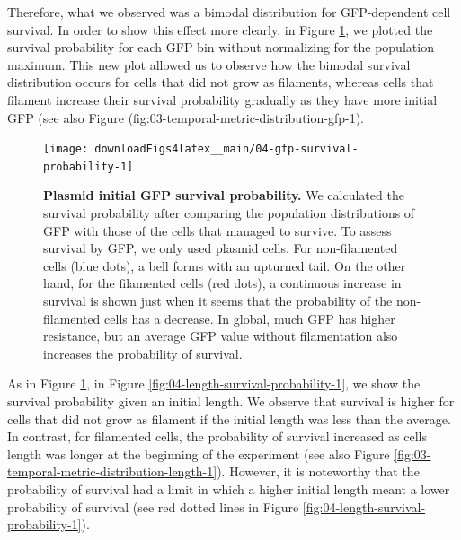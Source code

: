 \documentclass[a4paper, nobind]{templates/ociamthesis}
\begin{document}
Therefore, what we observed was a bimodal distribution for GFP-dependent cell survival.
In order to show this effect more clearly, in Figure \ref{fig:04-gfp-survival-probability-1}, we plotted the survival probability for each GFP bin without normalizing for the population maximum.
This new plot allowed us to observe how the bimodal survival distribution occurs for cells that did not grow as filaments, whereas cells that filament increase their survival probability gradually as they have more initial GFP (see also Figure \textcite{ref}(fig:03-temporal-metric-distribution-gfp-1).





\begin{figure}[H]
\texttt{[image: downloadFigs4latex\_\_main/04-gfp-survival-probability-1]} \caption[Plasmid initial GFP survival probability.]{\textbf{Plasmid initial GFP survival probability.} We calculated the survival probability after comparing the population distributions of GFP with those of the cells that managed to survive. To assess survival by GFP, we only used plasmid cells. For non-filamented cells (blue dots), a bell forms with an upturned tail. On the other hand, for the filamented cells (red dots), a continuous increase in survival is shown just when it seems that the probability of the non-filamented cells has a decrease. In global, much GFP has higher resistance, but an average GFP value without filamentation also increases the probability of survival.}\label{fig:04-gfp-survival-probability-1}
\end{figure}

As in Figure \ref{fig:04-gfp-survival-probability-1}, in Figure \ref{fig:04-length-survival-probability-1}, we show the survival probability given an initial length.
We observe that survival is higher for cells that did not grow as filament if the initial length was less than the average.
In contrast, for filamented cells, the probability of survival increased as cells length was longer at the beginning of the experiment (see also Figure \ref{fig:03-temporal-metric-distribution-length-1}).
However, it is noteworthy that the probability of survival had a limit in which a higher initial length meant a lower probability of survival (see red dotted lines in Figure \ref{fig:04-length-survival-probability-1}).
\end{document}
